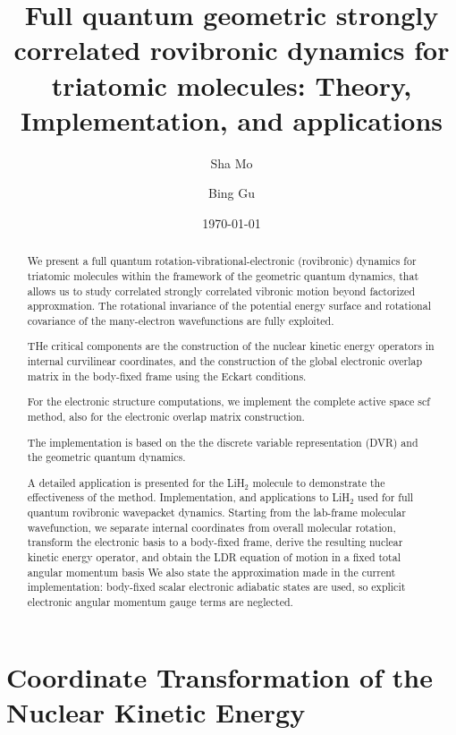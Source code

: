 \documentclass[11pt]{revtex4-2}
\begin{document}
\title{Full quantum geometric strongly correlated rovibronic dynamics for triatomic molecules: Theory,
 Implementation, and applications}
 \author{Sha Mo}
\author{Bing Gu}
\date{\today}


\begin{abstract}
We present a full quantum  rotation-vibrational-electronic (rovibronic) dynamics for triatomic molecules within the framework of the geometric quantum dynamics, that allows us to study correlated  strongly correlated vibronic motion beyond factorized approxmation. 
The rotational invariance of the potential energy surface and rotational covariance of the many-electron wavefunctions are fully exploited. 

THe critical components are the construction of the nuclear kinetic energy operators in internal curvilinear coordinates,
 and the construction of the global electronic overlap matrix in the body-fixed frame using the Eckart conditions. 
 
 For the electronic structure computations, we implement the complete active space scf method, also for the electronic overlap matrix construction.


The implementation is based on the  the discrete variable representation (DVR) and the geometric quantum dynamics. 

A detailed application is presented for the LiH$_2$ molecule to demonstrate the effectiveness of the method. 
 Implementation, and applications to  LiH$_2$
used for full quantum rovibronic wavepacket dynamics.  Starting from the
lab-frame molecular wavefunction, we separate internal coordinates from
overall molecular rotation, transform the electronic basis to a body-fixed
frame, derive the resulting nuclear kinetic energy operator, and obtain the
LDR equation of motion in a fixed total angular momentum basis
 We also state
the approximation made in the current implementation: body-fixed scalar
electronic adiabatic states are used, so explicit electronic angular
momentum gauge terms are neglected.
\end{abstract}
\maketitle



\section{Coordinate Transformation of the Nuclear Kinetic Energy}
\end{document}
